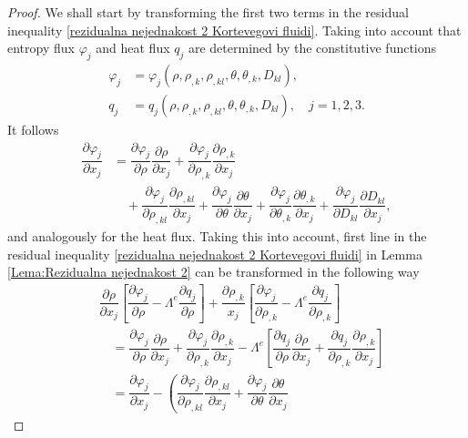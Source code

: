 \documentclass[10pt,a4paper]{amsart}
\begin{document}
\begin{proof}
	We shall start by transforming the first two terms in the residual inequality \eqref{rezidualna nejednakost 2 Kortevegovi fluidi}. Taking into account that entropy flux $\varphi_{j}$ and heat flux $q_{j}$ are determined by the constitutive functions
	\begin{align*}
		\varphi_j & = \varphi_{j}(\rho, \rho_{,k}, \rho_{,kl}, \theta, \theta_{,k}, D_{kl}), 
		\\
		q_j & = q_{j}(\rho, \rho_{,k}, \rho_{,kl}, \theta, \theta_{,k}, D_{kl}), \quad 
		j = 1, 2, 3. 
	\end{align*} 
	It follows 
	\begin{align*}
		\dfrac{\partial\varphi_j}{\partial x_j}
		& = \dfrac{\partial\varphi_j}{\partial\rho}\dfrac{\partial\rho}{\partial x_j} 
		+ \dfrac{\partial\varphi_j}{\partial\rho_{,k}}\dfrac{\partial\rho_{,k}}{\partial x_j} 
		\\
		& \quad + \dfrac{\partial\varphi_j}{\partial\rho_{,kl}}\dfrac{\partial\rho_{,kl}}{\partial x_j}+\dfrac{\partial\varphi_j}{\partial\theta}\dfrac{\partial\theta}{\partial x_j}+\dfrac{\partial\varphi_j}{\partial\theta_{,k}}\dfrac{\partial\theta_{,k}}{\partial x_j}+\dfrac{\partial\varphi_j}{\partial D_{kl}}\dfrac{\partial D_{kl}}{\partial x_j},
	\end{align*}
	and analogously for the heat flux. Taking this into account, first line in the residual inequality \eqref{rezidualna nejednakost 2 Kortevegovi fluidi} in Lemma \ref{Lema:Rezidualna nejednakost 2} can be transformed in the following way
	\begin{align*}
		& \dfrac{\partial\rho}{\partial x_j} \left[ \dfrac{\partial\varphi_j}{\partial\rho} 
		- \Lambda^e\dfrac{\partial q_j}{\partial\rho} \right] 
		+ \dfrac{\partial\rho_{,k}}{x_j} \left[ \dfrac{\partial\varphi_j}{\partial\rho_{,k}} 
		- \Lambda^e\dfrac{\partial q_j}{\partial\rho_{,k}} \right] \\
		& \quad = \dfrac{\partial\varphi_j}{\partial\rho} \dfrac{\partial\rho}{\partial x_j} 
		+ \dfrac{\partial\varphi_j}{\partial\rho_{,k}} \dfrac{\partial\rho_{,k}}{\partial x_j} 
		- \Lambda^e\left[\dfrac{\partial q_j}{\partial\rho}\dfrac{\partial\rho}{\partial x_j} 
		+ \dfrac{\partial q_j}{\partial\rho_{,k}} \dfrac{\partial\rho_{,k}}{\partial x_j}\right] \\
		& \quad = \dfrac{\partial\varphi_j}{\partial x_j} - \left(   
		\dfrac{\partial\varphi_j}{\partial\rho_{,kl}} \dfrac{\partial\rho_{,kl}}{\partial x_j} 
		+ \dfrac{\partial\varphi_j}{\partial\theta} \dfrac{\partial\theta}{\partial x_j} 

\end{align*}
\end{proof}
\end{document}
